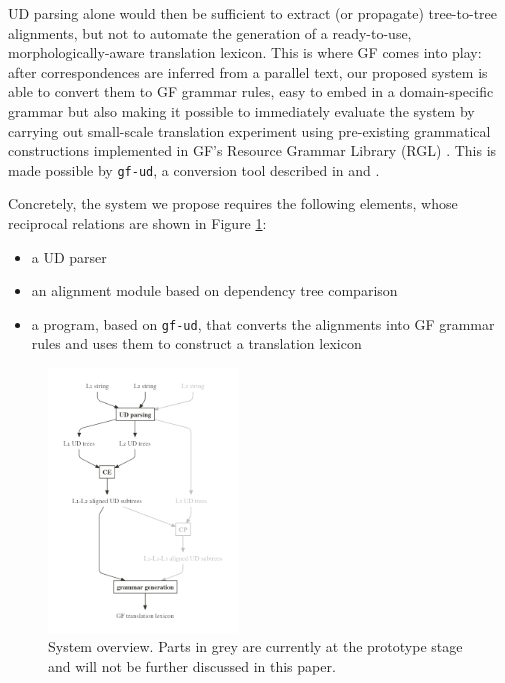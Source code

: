 \documentclass[11pt]{article}
\begin{document}
UD parsing alone would then be sufficient to extract (or propagate) tree-to-tree alignments, but not to automate the generation of a ready-to-use, morphologically-aware translation lexicon. This is where GF comes into play: after correspondences are inferred from a parallel text, our proposed system is able to convert them to GF grammar rules, easy to embed in a domain-specific grammar but also making it possible to immediately evaluate the system by carrying out small-scale translation experiment using pre-existing grammatical constructions implemented in GF's Resource Grammar Library (RGL) \cite{TODO:}. 
This is made possible by \texttt{gf-ud}, a conversion tool described in \cite{TODO:} and \cite{TODO:}.

Concretely, the system we propose requires the following elements, whose reciprocal relations are shown in Figure \ref{overview}: \smallskip

\begin{itemize}
  \item a UD parser
  \item an alignment module based on dependency tree comparison
  \item a program, based on \texttt{gf-ud}, that converts the alignments into GF grammar rules and uses them to construct a translation lexicon
\end{itemize} \smallskip

\begin{figure}[h]
  \centering
  \includegraphics[width=0.45\textwidth]{figures/overview.png}
  \caption[System overview]{System overview. Parts in grey are currently at the prototype stage and will not be further discussed in this paper.} \label{elems}
  \label{overview}
\end{figure}
\end{document}
